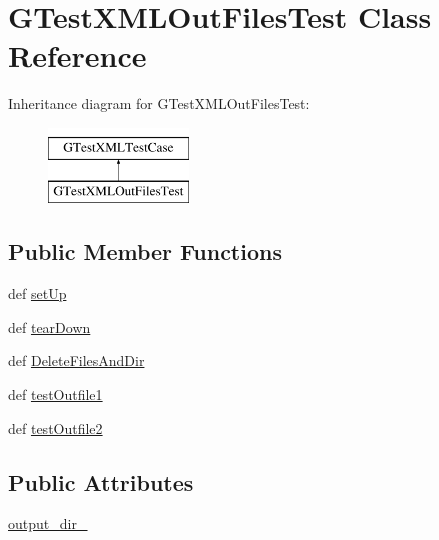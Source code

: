 \hypertarget{classgtest__xml__outfiles__test_1_1GTestXMLOutFilesTest}{\section{\-G\-Test\-X\-M\-L\-Out\-Files\-Test \-Class \-Reference}
\label{d2/d60/classgtest__xml__outfiles__test_1_1GTestXMLOutFilesTest}
}
\-Inheritance diagram for \-G\-Test\-X\-M\-L\-Out\-Files\-Test\-:\begin{figure}[H]
\begin{center}
\leavevmode
\includegraphics[height=2.000000cm]{d2/d60/classgtest__xml__outfiles__test_1_1GTestXMLOutFilesTest}
\end{center}
\end{figure}
\subsection*{\-Public \-Member \-Functions}
\begin{DoxyCompactItemize}
\item 
def \hyperlink{classgtest__xml__outfiles__test_1_1GTestXMLOutFilesTest_ac47956db61147fc100027de51240dcd7}{set\-Up}
\item 
def \hyperlink{classgtest__xml__outfiles__test_1_1GTestXMLOutFilesTest_ac975c98b6cd3c9d3d578faff95728cdf}{tear\-Down}
\item 
def \hyperlink{classgtest__xml__outfiles__test_1_1GTestXMLOutFilesTest_a34515dd29bceb5813dc1f24516f34bc3}{\-Delete\-Files\-And\-Dir}
\item 
def \hyperlink{classgtest__xml__outfiles__test_1_1GTestXMLOutFilesTest_a4a8cab8640de504a04df8cdddda7fad1}{test\-Outfile1}
\item 
def \hyperlink{classgtest__xml__outfiles__test_1_1GTestXMLOutFilesTest_a07f425a152af066edbe613f5f8b6e4bd}{test\-Outfile2}
\end{DoxyCompactItemize}
\subsection*{\-Public \-Attributes}
\begin{DoxyCompactItemize}
\item 
\hyperlink{classgtest__xml__outfiles__test_1_1GTestXMLOutFilesTest_a5440e2d1179d4c71570162e9f6c1bd34}{output\-\_\-dir\-\_\-}
\end{DoxyCompactItemize}
